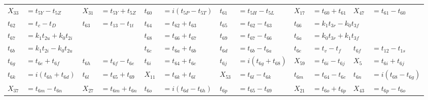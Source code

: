 \begin{tabular}{|p{4.3pt}l|p{4.3pt}l|p{4.3pt}l|p{4.3pt}l|p{4.3pt}l|p{4.3pt}l|}
$X_{33} $ &$= t_{5Y} - t_{5Z}$ & $X_{31} $ &$= t_{5Y} + t_{5Z}$ & $t_{60} $ &$= i(t_{5P} - t_{5T})$ & $t_{61} $ &$= t_{5H} - t_{5L}$ & $X_{17} $ &$= t_{60} + t_{61}$ & $X_{47} $ &$= t_{61} - t_{60}$\\ 
$t_{62} $ &$= t_c - t_D$ & $t_{63} $ &$= t_{13} - t_{1t}$ & $t_{64} $ &$= t_{62} + t_{63}$ & $t_{65} $ &$= t_{62} - t_{63}$ & $t_{66} $ &\multicolumn{3}{l|}{$= k_1t_{3r} - k_0t_{3f}$}\\ 
$t_{67} $ &\multicolumn{3}{l|}{$= k_1t_{2u} + k_0t_{2i}$} & $t_{68} $ &$= t_{66} + t_{67}$ & $t_{69} $ &$= t_{67} - t_{66}$ & $t_{6a} $ &\multicolumn{3}{l|}{$= k_0t_{3r} + k_1t_{3f}$}\\ 
$t_{6b} $ &\multicolumn{3}{l|}{$= k_1t_{2i} - k_0t_{2u}$} & $t_{6c} $ &$= t_{6a} + t_{6b}$ & $t_{6d} $ &$= t_{6b} - t_{6a}$ & $t_{6e} $ &$= t_v - t_f$ & $t_{6f} $ &$= t_{12} - t_{1s}$\\ 
$t_{6g} $ &$= t_{6e} + t_{6f}$ & $t_{6h} $ &$= t_{6f} - t_{6e}$ & $t_{6i} $ &$= t_{64} + t_{6c}$ & $t_{6j} $ &$= i(t_{6g} + t_{68})$ & $X_{59} $ &$= t_{6i} - t_{6j}$ & $X_5 $ &$= t_{6i} + t_{6j}$\\ 
$t_{6k} $ &$= i(t_{6h} + t_{6d})$ & $t_{6l} $ &$= t_{65} + t_{69}$ & $X_{11} $ &$= t_{6k} + t_{6l}$ & $X_{53} $ &$= t_{6l} - t_{6k}$ & $t_{6m} $ &$= t_{64} - t_{6c}$ & $t_{6n} $ &$= i(t_{68} - t_{6g})$\\ 
$X_{37} $ &$= t_{6m} - t_{6n}$ & $X_{27} $ &$= t_{6m} + t_{6n}$ & $t_{6o} $ &$= i(t_{6d} - t_{6h})$ & $t_{6p} $ &$= t_{65} - t_{69}$ & $X_{21} $ &$= t_{6o} + t_{6p}$ & $X_{43} $ &$= t_{6p} - t_{6o}$\\ 
\bottomrule\end{tabular}
